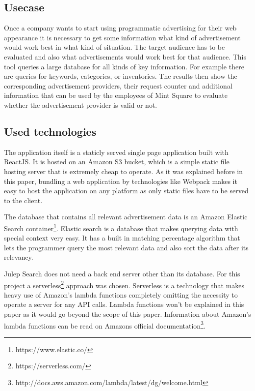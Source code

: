 \subsection{Usecase}

Once a company wants to start using programmatic advertising for their web appearance it is necessary to get some information what kind of advertisement would work best in what kind of situation. The target audience has to be evaluated and also what advertisements would work best for that audience. This tool queries a large database for all kinds of key information. For example there are queries for keywords, categories, or inventories. The results then show the corresponding advertisement providers, their request counter and additional information that can be used by the employees of Mint Square to evaluate whether the advertisement provider is valid or not.

\subsection{Used technologies} \label{ssec:usedtechnologies}

The application itself is a staticly served single page application built with ReactJS. It is hosted on an Amazon S3 bucket, which is a simple static file hosting server that is extremely cheap to operate. As it was explained before in this paper, bundling a web application by technologies like Webpack makes it easy to host the application on any platform as only static files have to be served to the client.

The database that contains all relevant advertisement data is an Amazon Elastic Search container\footnote{https://www.elastic.co/}. Elastic search is a database that makes querying data with special context very easy. It has a built in matching percentage algorithm that lets the programmer query the most relevant data and also sort the data after its relevancy.

Julep Search does not need a back end server other than its database. For this project a serverless\footnote{https://serverless.com/} approach was chosen. Serverless is a technology that makes heavy use of Amazon's lambda functions completely omitting the necessity to operate a server for any API calls. Lambda functions won't be explained in this paper as it would go beyond the scope of this paper. Information about Amazon's lambda functions can be read on Amazons official documentation\footnote{http://docs.aws.amazon.com/lambda/latest/dg/welcome.html}.

